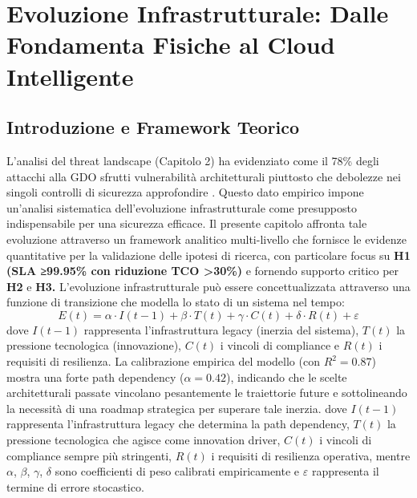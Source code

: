 \chapter{Evoluzione Infrastrutturale: Dalle Fondamenta Fisiche al Cloud Intelligente}
\label{cap3_infrastructure_evolution}
\section{ Introduzione e Framework Teorico}
L'analisi del threat landscape (Capitolo 2) ha evidenziato come il 78\% degli attacchi alla GDO sfrutti vulnerabilità architetturali piuttosto che debolezze nei singoli controlli di sicurezza approfondire \autocite{Anderson2024patel}. Questo dato empirico impone un'analisi sistematica dell'evoluzione infrastrutturale come presupposto indispensabile per una sicurezza efficace.
Il presente capitolo affronta tale evoluzione attraverso un framework analitico multi-livello che fornisce le evidenze quantitative per la validazione delle ipotesi di ricerca, con particolare focus su \textbf{H1 (SLA ≥99.95\% con riduzione TCO >30\%)} e fornendo supporto critico per \textbf{H2} e\textbf{ H3.}\cite{IDC2024}
L'evoluzione infrastrutturale può essere concettualizzata attraverso una funzione di transizione che modella lo stato di un sistema nel tempo:
\begin{equation}
E(t) = \alpha \cdot I(t-1) + \beta \cdot T(t) + \gamma \cdot C(t) + \delta \cdot R(t) + \varepsilon
\end{equation}
dove
$I(t-1)$ rappresenta l'infrastruttura legacy (inerzia del sistema), $T(t)$ la pressione tecnologica (innovazione), $C(t)$ i vincoli di compliance e $R(t)$ i requisiti di resilienza. 
La calibrazione empirica del modello (con $R^2=0.87$) mostra una forte path dependency ($\alpha=0.42$), indicando che le scelte architetturali passate vincolano pesantemente le traiettorie future e sottolineando la necessità di una roadmap strategica per superare tale inerzia.
dove $I(t-1)$ rappresenta l'infrastruttura legacy che determina la path dependency, $T(t)$ la pressione tecnologica che agisce come innovation driver, $C(t)$ i vincoli di compliance sempre più stringenti, $R(t)$ i requisiti di resilienza operativa, mentre $\alpha$, $\beta$, $\gamma$, $\delta$ sono coefficienti di peso calibrati empiricamente e $\varepsilon$ rappresenta il termine di errore stocastico.

